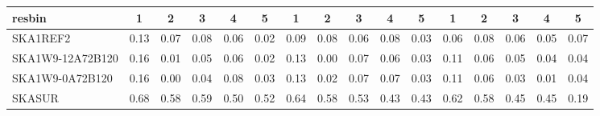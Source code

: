 \begin{table}[!htp]
{{\begin{tabular}{|lccccc||ccccc||ccccc|}
 resbin  &1 & 2 & 3 & 4 & 5 & 1 & 2 & 3 & 4 & 5 & 1 & 2 & 3 & 4 & 5 \tabularnewline \hline
SKA1REF2 & 0.13 \cellcolor{blue!18.00} & 0.07 \cellcolor{red!23.07} & 0.08 \cellcolor{green!21.05} & 0.06 \cellcolor{orange!18.00} & 0.02 \cellcolor{purple!18.00} & 0.09 \cellcolor{blue!18.00} & 0.08 \cellcolor{red!23.79} & 0.06 \cellcolor{green!18.00} & 0.08 \cellcolor{orange!20.27} & 0.03 \cellcolor{purple!18.00} & 0.06 \cellcolor{blue!18.00} & 0.08 \cellcolor{red!19.62} & 0.06 \cellcolor{green!21.00} & 0.05 \cellcolor{orange!21.82} & 0.07 \cellcolor{purple!26.40}\\ \hline 
SKA1W9-12A72B120 & 0.16 \cellcolor{blue!20.29} & 0.01 \cellcolor{red!18.72} & 0.05 \cellcolor{green!18.76} & 0.06 \cellcolor{orange!18.00} & 0.02 \cellcolor{purple!18.00} & 0.13 \cellcolor{blue!21.05} & 0.00 \cellcolor{red!18.00} & 0.07 \cellcolor{green!18.89} & 0.06 \cellcolor{orange!18.00} & 0.03 \cellcolor{purple!18.00} & 0.11 \cellcolor{blue!21.75} & 0.06 \cellcolor{red!18.00} & 0.05 \cellcolor{green!20.00} & 0.04 \cellcolor{orange!20.86} & 0.04 \cellcolor{purple!18.00}\\ \hline 
SKA1W9-0A72B120 & 0.16 \cellcolor{blue!20.29} & 0.00 \cellcolor{red!18.00} & 0.04 \cellcolor{green!18.00} & 0.08 \cellcolor{orange!19.91} & 0.03 \cellcolor{purple!18.84} & 0.13 \cellcolor{blue!21.05} & 0.02 \cellcolor{red!19.45} & 0.07 \cellcolor{green!18.89} & 0.07 \cellcolor{orange!19.14} & 0.03 \cellcolor{purple!18.00} & 0.11 \cellcolor{blue!21.75} & 0.06 \cellcolor{red!18.00} & 0.03 \cellcolor{green!18.00} & 0.01 \cellcolor{orange!18.00} & 0.04 \cellcolor{purple!18.00}\\ \hline 
SKASUR & 0.68 \cellcolor{blue!60.00} & 0.58 \cellcolor{red!60.00} & 0.59 \cellcolor{green!60.00} & 0.50 \cellcolor{orange!60.00} & 0.52 \cellcolor{purple!60.00} & 0.64 \cellcolor{blue!60.00} & 0.58 \cellcolor{red!60.00} & 0.53 \cellcolor{green!60.00} & 0.43 \cellcolor{orange!60.00} & 0.43 \cellcolor{purple!60.00} & 0.62 \cellcolor{blue!60.00} & 0.58 \cellcolor{red!60.00} & 0.45 \cellcolor{green!60.00} & 0.45 \cellcolor{orange!60.00} & 0.19 \cellcolor{purple!60.00}\tabularnewline \hline 
\end{tabular}}\hfil 
{}}
\end{table}
